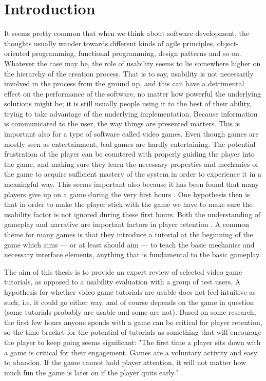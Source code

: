 \chapter{Introduction}
It seems pretty common that when we think about software development, the thoughts usually wander towards different kinds of agile principles, object-oriented programming, functional programming, design patterns and so on. Whatever the case may be, the role of usability seems to lie somewhere higher on the hierarchy of the creation process. That is to say, usability is not necessarily involved in the process from the ground up, and this can have a detrimental effect on the performance of the software, no matter how powerful the underlying solutions might be; it is still usually people using it to the best of their ability, trying to take advantage of the underlying implementation. Because information is communicated to the user, the way things are presented matters. This is important also for a type of software called video games. Even though games are mostly seen as entertainment, bad games are hardly entertaining. The potential frustration of the player can be countered with properly guiding the player into the game, and making sure they learn the necessary properties and mechanics of the game to acquire sufficient mastery of the system in order to experience it in a meaningful way. This seems important also because it has been found that many players give up on a game during the very first hours \cite{Bauckhage2012}. One hypothesis then is that in order to make the player stick with the game we have to make sure the usability factor is not ignored during these first hours. Both the understanding of gameplay and narrative are important factors in player retention \cite{Cheung2014}. A common theme for many games is that they introduce a tutorial at the beginning of the game which aims --- or at least should aim --- to teach the basic mechanics and necessary interface elements, anything that is fundamental to the basic gameplay. 

The aim of this thesis is to provide an expert review of selected video game tutorials, as opposed to a usability evaluation with a group of test users. A hypothesis for whether video game tutorials are usable does not feel intuitive as such, i.e. it could go either way, and of course depends on the game in question (some tutorials probably are usable and some are not). Based on some research, the first few hours anyone spends with a game can be critical for player retention, so the time bracket for the potential of tutorials as something that will encourage the player to keep going seems significant: "The first time a player sits down with a game is critical for their engagement. Games are a voluntary activity and easy to abandon. If the game cannot hold player attention, it will not matter how much fun the game is later on if the player quits early." \cite{Cheung2014}.